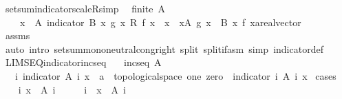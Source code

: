\begin{isabellebody}
\ setsum{\isacharunderscore}indicator{\isacharunderscore}scaleR{\isacharbrackleft}simp{\isacharbrackright}{\isacharcolon}\isanewline
\ \ {\isachardoublequoteopen}finite\ A\ {\isasymLongrightarrow}\isanewline
\ \ \ \ {\isacharparenleft}{\isasymSum}x\ {\isasymin}\ A{\isachardot}\ indicator\ {\isacharparenleft}B\ x{\isacharparenright}\ {\isacharparenleft}g\ x{\isacharparenright}\ {\isacharasterisk}\isactrlsub R\ f\ x{\isacharparenright}\ {\isacharequal}\ {\isacharparenleft}{\isasymSum}x\ {\isasymin}\ {\isacharbraceleft}x{\isasymin}A{\isachardot}\ g\ x\ {\isasymin}\ B\ x{\isacharbraceright}{\isachardot}\ f\ x{\isacharcolon}{\isacharcolon}{\isacharprime}a{\isacharcolon}{\isacharcolon}real{\isacharunderscore}vector{\isacharparenright}{\isachardoublequoteclose}\isanewline
%
\isadelimproof
\ \ %
\endisadelimproof
%
\isatagproof
{}\isamarkupfalse%
\ assms\ \isamarkupfalse%
\ {\isacharparenleft}auto\ intro{\isacharbang}{\isacharcolon}\ setsum{\isachardot}mono{\isacharunderscore}neutral{\isacharunderscore}cong{\isacharunderscore}right\ split{\isacharcolon}\ split{\isacharunderscore}if{\isacharunderscore}asm\ simp{\isacharcolon}\ indicator{\isacharunderscore}def{\isacharparenright}%
\endisatagproof
{\isafoldproof}%
%
\isadelimproof
\isanewline
%
\endisadelimproof
\isanewline
{}\isamarkupfalse%
\ LIMSEQ{\isacharunderscore}indicator{\isacharunderscore}incseq{\isacharcolon}\isanewline
\ \ \ {\isachardoublequoteopen}incseq\ A{\isachardoublequoteclose}\isanewline
\ \ \ {\isachardoublequoteopen}{\isacharparenleft}{\isasymlambda}i{\isachardot}\ indicator\ {\isacharparenleft}A\ i{\isacharparenright}\ x\ {\isacharcolon}{\isacharcolon}\ {\isacharprime}a\ {\isacharcolon}{\isacharcolon}\ {\isacharbraceleft}topological{\isacharunderscore}space{\isacharcomma}\ one{\isacharcomma}\ zero{\isacharbraceright}{\isacharparenright}\ {\isacharminus}{\isacharminus}{\isacharminus}{\isacharminus}{\isachargreater}\ indicator\ {\isacharparenleft}{\isasymUnion}i{\isachardot}\ A\ i{\isacharparenright}\ x{\isachardoublequoteclose}\isanewline
%
\isadelimproof
%
\endisadelimproof
%
\isatagproof
{}\isamarkupfalse%
\ cases\isanewline
\ \ \isamarkupfalse%
\ {\isachardoublequoteopen}{\isasymexists}i{\isachardot}\ x\ {\isasymin}\ A\ i{\isachardoublequoteclose}\isanewline
\ \ \isamarkupfalse%
\ \isamarkupfalse%
\ i\ \ {\isachardoublequoteopen}x\ {\isasymin}\ A\ i{\isachardoublequoteclose}\isanewline
\ \ \ \ \isamarkupfalse%

\end{isabellebody}
